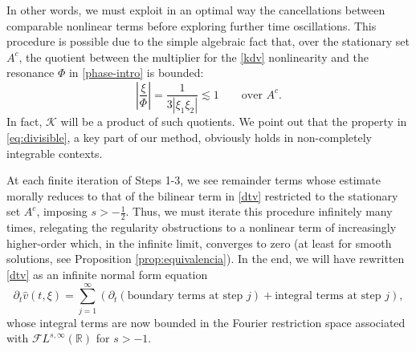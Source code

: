 \documentclass[a4paper,
11pt,  reqno]{amsart}
\newcommand{\5}{\textup{V}}
\newcommand{\dt}{\partial_t}
\theoremstyle{remark}
\newcommand{\R}{\mathbb{R}}
\numberwithin{equation}{section}
\numberwithin{theorem}{section}
\begin{document}
    \medskip

    In other words, we must exploit in an optimal way the cancellations between comparable nonlinear terms before exploring further time oscillations. This procedure is possible due to the simple algebraic fact that, over the stationary set $A^c$, the quotient between the multiplier for the \eqref{kdv} nonlinearity and the resonance $\Phi$ in \eqref{phase-intro} is bounded:
\begin{equation}\label{eq:divisible}
		\left|\frac{\xi}{\Phi}\right|=\frac{1}{3|\xi_1\xi_2|}\lesssim 1\qquad \mbox{over }A^c.
\end{equation}
In fact, $\mathcal{K}$ will be a product of such quotients.
		We point out that the property in \eqref{eq:divisible}, a key part of our method, obviously holds in non-completely integrable contexts.


    \medskip


At each finite iteration of Steps 1-3, we see remainder terms whose estimate morally reduces to that of the bilinear term in \eqref{dtv} restricted to the stationary set $A^c$,  imposing $s>-\frac12$. Thus, we must iterate this procedure infinitely many times,  relegating the regularity obstructions to a nonlinear term of increasingly higher-order which, in the infinite limit, converges to zero (at least for smooth solutions, see Proposition \ref{prop:equivalencia}).
    In the end, we will have rewritten \eqref{dtv} as an infinite normal form equation
\begin{equation}\label{eq:nfe_intro}
		\dt\widehat{v}(t,\xi)=  \sum_{j=1}^\infty \left(\dt\left(\mbox{boundary terms at step } j\right)+ \mbox{integral terms at step }j\right),
	\end{equation}
	whose integral terms are now bounded in the Fourier restriction space associated with $\mathcal{F}L^{s,\infty}(\R)$ for $s>-1$.
\end{document}

